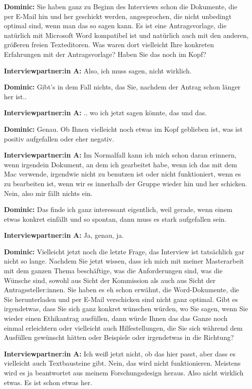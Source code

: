 \documentclass[a4paper,12pt,twoside]{scrreprt}
\begin{document}
\textbf{Dominic:} Sie haben ganz zu Beginn des Interviews schon die Dokumente, die per E-Mail hin und her geschickt werden, angesprochen, die nicht unbedingt optimal sind, wenn man das so sagen kann. Es ist eine Antragsvorlage, die natürlich mit Microsoft Word kompatibel ist und natürlich auch mit den anderen, größeren freien Texteditoren. Was waren dort vielleicht Ihre konkreten Erfahrungen mit der Antragsvorlage? Haben Sie das noch im Kopf?

\textbf{Interviewpartner:in A:} Also, ich muss sagen, nicht wirklich.

\textbf{Dominic:} Gibt’s in dem Fall nichts, das Sie, nachdem der Antrag schon länger her ist..

\textbf{Interviewpartner:in A:} .. wo ich jetzt sagen könnte, das und das.

\textbf{Dominic:} Genau. Ob Ihnen vielleicht noch etwas im Kopf geblieben ist, was ist positiv aufgefallen oder eher negativ.

\textbf{Interviewpartner:in A:} Im Normalfall kann ich mich schon daran erinnern, wenn irgendein Dokument, an dem ich gearbeitet habe, wenn ich das mit dem Mac verwende, irgendwie nicht zu benutzen ist oder nicht funktioniert, wenn es zu bearbeiten ist, wenn wir es innerhalb der Gruppe wieder hin und her schicken. Nein, also mir fällt nichts ein.

\textbf{Dominic:} Das finde ich ganz interessant eigentlich, weil gerade, wenn einem etwas konkret einfällt und so spontan, dann muss es stark aufgefallen sein.

\textbf{Interviewpartner:in A:} Ja, genau, ja.

\textbf{Dominic:} Vielleicht jetzt noch die letzte Frage, das Interview ist tatsächlich gar nicht so lange. Nachdem Sie jetzt wissen, dass ich mich mit meiner Masterarbeit mit dem ganzen Thema beschäftige, was die Anforderungen sind, was die Wünsche sind, sowohl aus Sicht der Kommission als auch aus Sicht der Antragssteller:innen. Sie haben es eh schon erwähnt, die Word-Dokumente, die Sie herunterladen und per E-Mail verschicken sind nicht ganz optimal. Gibt es irgendetwas, dass Sie sich ganz konkret wünschen würden, wo Sie sagen, wenn Sie wieder einen Ethikantrag ausfüllen, dann würde Ihnen das das Ganze noch einmal erleichtern oder vielleicht auch Hilfestellungen, die Sie sich während dem Ausfüllen gewünscht hätten oder Beispiele oder irgendetwas in die Richtung?

\textbf{Interviewpartner:in A:} Ich weiß jetzt nicht, ob das hier passt, aber dass es vielleicht auch Textbausteine gibt. Nein, das wird nicht funktionieren. Meistens wird es ja beantwortet aus meinem Forschungsdesign heraus. Also nicht wirklich etwas. Es ist schon etwas her.
\end{document}
